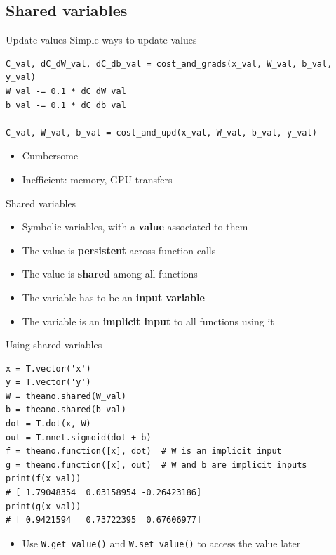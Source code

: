 \documentclass[a4paper,9pt]{beamer}
\begin{document}
\subsection{Shared variables}
\begin{frame}[fragile]{Update values}
  Simple ways to update values
  \begin{verbatim}
C_val, dC_dW_val, dC_db_val = cost_and_grads(x_val, W_val, b_val, y_val)
W_val -= 0.1 * dC_dW_val
b_val -= 0.1 * dC_db_val

C_val, W_val, b_val = cost_and_upd(x_val, W_val, b_val, y_val)
  \end{verbatim}
  \begin{itemize}
    \item Cumbersome
    \item Inefficient: memory, GPU transfers
  \end{itemize}
\end{frame}

\begin{frame}{Shared variables}
  \begin{itemize}
    \item Symbolic variables, with a {\bf value} associated to them
    \item The value is {\bf persistent} across function calls
    \item The value is {\bf shared} among all functions
    \item The variable has to be an {\bf input variable}
    \item The variable is an {\bf implicit input} to all functions using it
  \end{itemize}
\end{frame}

\begin{frame}[fragile]{Using shared variables}
  \begin{verbatim}
x = T.vector('x')
y = T.vector('y')
W = theano.shared(W_val)
b = theano.shared(b_val)
dot = T.dot(x, W)
out = T.nnet.sigmoid(dot + b)
f = theano.function([x], dot)  # W is an implicit input
g = theano.function([x], out)  # W and b are implicit inputs
print(f(x_val))
# [ 1.79048354  0.03158954 -0.26423186]
print(g(x_val))
# [ 0.9421594   0.73722395  0.67606977]
  \end{verbatim}
  \begin{itemize}
    \item Use \verb|W.get_value()| and \verb|W.set_value()|
      to access the value later
  \end{itemize}
\end{frame}
\end{document}
